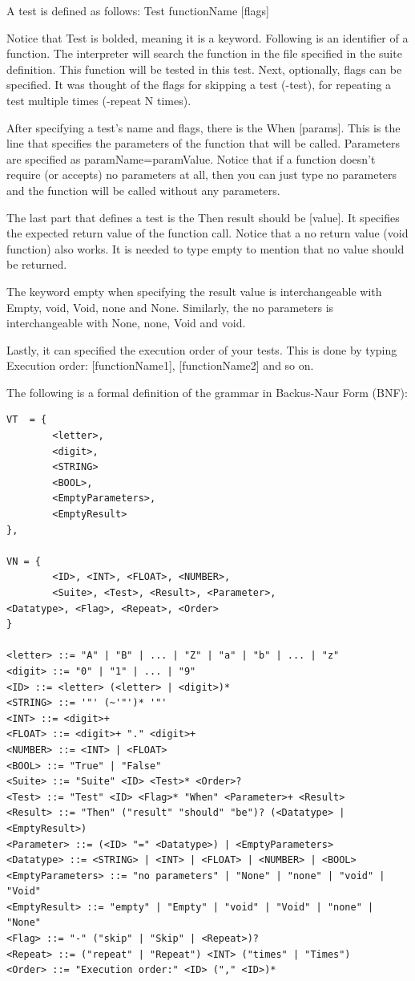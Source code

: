 A test is defined as follows:
Test functionName [flags]

Notice that Test is bolded, meaning it is a keyword. Following is an identifier of a function. The interpreter will search the function in the file specified in the suite definition. This function will be tested in this test. Next, optionally, flags can be specified. It was thought of the flags for skipping a test (-test), for repeating a test multiple times (-repeat N times). 

After specifying a test’s name and flags, there is the When [params]. This is the line that specifies the parameters of the function that will be called. Parameters are specified as paramName=paramValue. Notice that if a function doesn’t require (or accepts) no parameters at all, then you can just type no parameters and the function will be called without any parameters.

The last part that defines a test is the Then result should be [value]. It specifies the expected return value of the function call. Notice that a no return value (void function) also works. It is needed to type empty to mention that no value should be returned.

The keyword empty when specifying the result value is interchangeable with Empty, void, Void, none and None. Similarly, the no parameters is interchangeable with None, none, Void and void.

Lastly, it can specified the execution order of your tests. This is done by typing Execution order: [functionName1], [functionName2] and so on.

The following is a formal definition of the grammar in Backus-Naur Form (BNF):
\begin{verbatim}
VT  = {
		<letter>,
		<digit>,
		<STRING>
		<BOOL>,
		<EmptyParameters>,
		<EmptyResult>		
},

VN = {
		<ID>, <INT>, <FLOAT>, <NUMBER>,
		<Suite>, <Test>, <Result>, <Parameter>,
<Datatype>, <Flag>, <Repeat>, <Order>
}

<letter> ::= "A" | "B" | ... | "Z" | "a" | "b" | ... | "z"
<digit> ::= "0" | "1" | ... | "9"
<ID> ::= <letter> (<letter> | <digit>)*
<STRING> ::= '"' (~'"')* '"'
<INT> ::= <digit>+
<FLOAT> ::= <digit>+ "." <digit>+
<NUMBER> ::= <INT> | <FLOAT>
<BOOL> ::= "True" | "False"
<Suite> ::= "Suite" <ID> <Test>* <Order>?
<Test> ::= "Test" <ID> <Flag>* "When" <Parameter>+ <Result>
<Result> ::= "Then" ("result" "should" "be")? (<Datatype> | <EmptyResult>)
<Parameter> ::= (<ID> "=" <Datatype>) | <EmptyParameters>
<Datatype> ::= <STRING> | <INT> | <FLOAT> | <NUMBER> | <BOOL>
<EmptyParameters> ::= "no parameters" | "None" | "none" | "void" | "Void"
<EmptyResult> ::= "empty" | "Empty" | "void" | "Void" | "none" | "None"
<Flag> ::= "-" ("skip" | "Skip" | <Repeat>)?
<Repeat> ::= ("repeat" | "Repeat") <INT> ("times" | "Times")
<Order> ::= "Execution order:" <ID> ("," <ID>)*
\end{verbatim}

